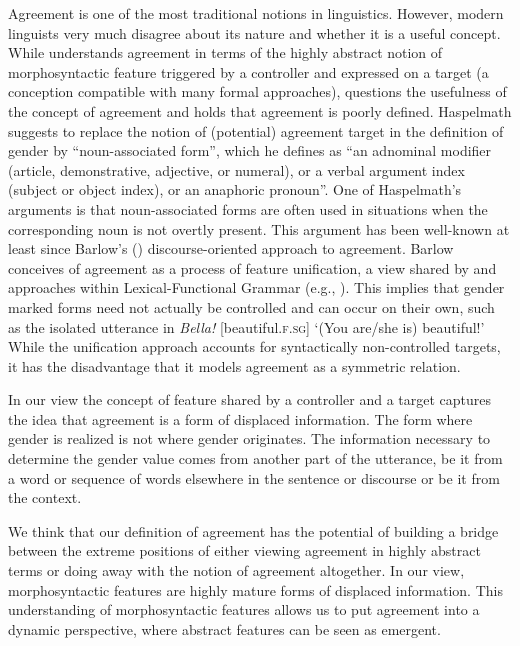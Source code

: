 \documentclass[output=collectionpaper]{langsci/langscibook}
\begin{document}
Agreement is one of the most traditional notions in linguistics. However, modern linguists very much disagree about its nature and whether it is a useful concept. While \cite{Corbett2006} understands agreement in terms of the highly abstract notion of morphosyntactic feature triggered by a controller and expressed on a target (a conception compatible with many formal approaches), \cite{Croft2013} questions the usefulness of the concept of agreement and \cite{Haspelmath2018} holds that agreement is poorly defined. Haspelmath suggests to replace the notion of (potential) agreement target in the definition of gender by ``noun-associated form'', which he defines as ``an adnominal modifier (article, demonstrative, adjective, or numeral), or a verbal argument index (subject or object index), or an anaphoric pronoun''. One of Haspelmath's arguments is that noun-associated forms are often used in situations when the corresponding noun is not overtly present. This argument has been well-known at least since Barlow's (\citeyear[190]{Barlow1999}) discourse-oriented approach to agreement. Barlow conceives of agreement as a process of feature unification, a view shared by \cite{Corbett2006} and approaches within Lexical-Functional Grammar (e.g., \citealt{Kuhn2007}). This implies that gender marked forms need not actually be controlled and can occur on their own, such as the isolated utterance in  \textit{Bella!} [beautiful.\textsc{f.sg}] `(You are/she is) beautiful!' While the unification approach accounts for syntactically non-controlled targets, it has the disadvantage that it models agreement as a symmetric relation.

In our view the concept of feature shared by a controller and a target captures the idea that agreement is a form of displaced information. The form where gender is realized is not where gender originates. The information necessary to determine the gender value comes from another part of the utterance, be it from a word or sequence of words elsewhere in the sentence or discourse or be it from the context.

We think that our definition of agreement has the potential of building a bridge between the extreme positions of either viewing agreement in highly abstract terms or doing away with the notion of agreement altogether. In our view, morphosyntactic features are highly mature forms of displaced information. This understanding of morphosyntactic features allows us to put agreement into a dynamic perspective, where abstract features can be seen as emergent.
\end{document}
